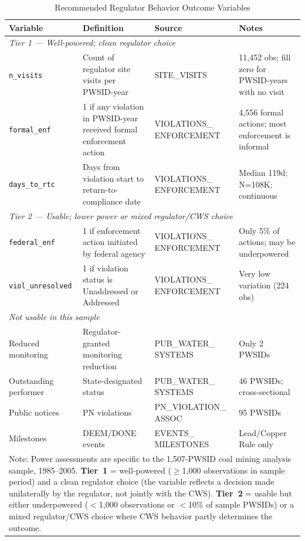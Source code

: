 \begin{table}[h!]
\centering
\caption{Recommended Regulator Behavior Outcome Variables}
\label{tab:regulator_outcomes}
\small
\begin{tabular}{p{3.8cm}p{4.2cm}p{2.2cm}p{3cm}}
\hline\hline
Variable & Definition & Source & Notes \\
\hline
\multicolumn{4}{l}{\textit{Tier 1 — Well-powered; clean regulator choice}} \\[2pt]
\texttt{n\_visits} & Count of regulator site visits per PWSID-year & SITE\_VISITS & 11,452 obs; fill zero for PWSID-years with no visit \\[4pt]
\texttt{formal\_enf} & 1 if any violation in PWSID-year received formal enforcement action & VIOLATIONS\_ ENFORCEMENT & 4,556 formal actions; most enforcement is informal \\[4pt]
\texttt{days\_to\_rtc} & Days from violation start to return-to-compliance date & VIOLATIONS\_ ENFORCEMENT & Median 119d; N=108K; continuous \\[6pt]
\multicolumn{4}{l}{\textit{Tier 2 — Usable; lower power or mixed regulator/CWS choice}} \\[2pt]
\texttt{federal\_enf} & 1 if enforcement action initiated by federal agency & VIOLATIONS\_ ENFORCEMENT & Only 5\% of actions; may be underpowered \\[4pt]
\texttt{viol\_unresolved} & 1 if violation status is Unaddressed or Addressed & VIOLATIONS\_ ENFORCEMENT & Very low variation (224 obs) \\[6pt]
\multicolumn{4}{l}{\textit{Not usable in this sample}} \\[2pt]
Reduced monitoring & Regulator-granted monitoring reduction & PUB\_WATER\_ SYSTEMS & Only 2 PWSIDs \\
Outstanding performer & State-designated status & PUB\_WATER\_ SYSTEMS & 46 PWSIDs; cross-sectional \\
Public notices & PN violations & PN\_VIOLATION\_ ASSOC & 95 PWSIDs \\
Milestones & DEEM/DONE events & EVENTS\_ MILESTONES & Lead/Copper Rule only \\
\hline\hline
\multicolumn{4}{p{13cm}}{\footnotesize Note: Power assessments are specific to the 1,507-PWSID coal mining analysis sample, 1985--2005. \textbf{Tier~1} = well-powered ($\geq$1,000 observations in sample period) and a clean regulator choice (the variable reflects a decision made unilaterally by the regulator, not jointly with the CWS). \textbf{Tier~2} = usable but either underpowered ($<$1,000 observations or $<$10\% of sample PWSIDs) or a mixed regulator/CWS choice where CWS behavior partly determines the outcome.} \\
\end{tabular}
\end{table}


